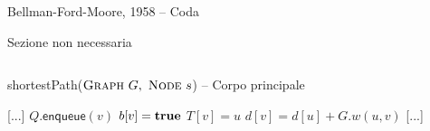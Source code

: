 \begin{frame}{Bellman-Ford-Moore, 1958 -- Coda}

\vspace{-9pt}
\begin{myboxtitle}
\BI
\item Sezione non necessaria
\EI
\end{myboxtitle}

\vspace{-18pt}
\begin{columns}
\small
\begin{Procedure}
\caption[A]{\textsf{shortestPath}($\textsc{Graph}\ G,\ \textsc{Node}\ s$) -- Corpo principale}
[...]\;
    {
      {
        $Q.\textsf{enqueue}(v)$\;
        $b[v] = \TRUE$\;
      }
      $T[v] = u$\;
      $d[v] = d[u] + G.w(u,v)$\;
    }
[...]\;
\end{Procedure}
\end{columns}

\end{frame}



